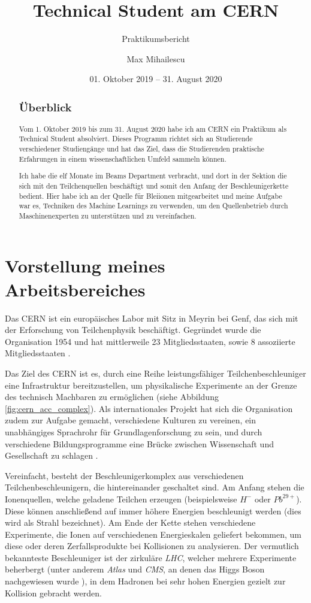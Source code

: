 \documentclass[11pt, a4paper, titlepage, headings=standardclasses]{scrartcl}
\author{Max Mihailescu}
\title{Technical Student am CERN}
\subtitle{Praktikumsbericht}
\date{01. Oktober 2019 -- 31. August 2020}
\begin{document}
\maketitle
{}

\begin{abstract}
	\subsection*{Überblick}
	\noindent Vom 1. Oktober 2019 bis zum 31. August 2020 habe ich am CERN ein Praktikum als Technical Student absolviert. Dieses Programm richtet sich an Studierende verschiedener Studiengänge und hat das Ziel, dass die Studierenden praktische Erfahrungen in einem wissenschaftlichen Umfeld sammeln können.
	
	Ich habe die elf Monate im Beams Department verbracht, und dort in der Sektion die sich mit den Teilchenquellen beschäftigt und somit den Anfang der Beschleunigerkette bedient. Hier habe ich an der Quelle für Bleiionen mitgearbeitet und meine Aufgabe war es, Techniken des Machine Learnings zu verwenden, um den Quellenbetrieb durch Maschinenexperten zu unterstützen und zu vereinfachen.
\end{abstract}

\section{Vorstellung meines Arbeitsbereiches}
Das CERN ist ein europäisches Labor mit Sitz in Meyrin bei Genf, das sich mit der Erforschung von Teilchenphysik beschäftigt. Gegründet wurde die Organisation 1954 und hat mittlerweile 23 Mitgliedsstaaten, sowie 8 assoziierte Mitgliedsstaaten \cite{CERN:AnnualReport2019}. 

Das Ziel des CERN ist es, durch eine Reihe leistungsfähiger Teilchenbeschleuniger eine Infrastruktur bereitzustellen, um physikalische Experimente an der Grenze des technisch Machbaren zu ermöglichen (siehe Abbildung \ref{fig:cern_acc_complex}). Als internationales Projekt hat sich die Organisation zudem zur Aufgabe gemacht, verschiedene Kulturen zu vereinen, ein unabhängiges Sprachrohr für Grundlagenforschung zu sein, und durch verschiedene Bildungsprogramme eine Brücke zwischen Wissenschaft und Gesellschaft zu schlagen \cite{CERN:Mission}.

Vereinfacht, besteht der Beschleunigerkomplex aus verschiedenen Teilchenbeschleunigern, die hintereinander geschaltet sind. Am Anfang stehen die Ionenquellen, welche geladene Teilchen erzeugen (beispielsweise $H^-$ oder $Pb^{29+}$). Diese können anschließend auf immer höhere Energien beschleunigt werden (dies wird als Strahl bezeichnet). Am Ende der Kette stehen verschiedene Experimente, die Ionen auf verschiedenen Energieskalen geliefert bekommen, um diese oder deren Zerfallsprodukte bei Kollisionen zu analysieren. Der vermutlich bekannteste Beschleuniger ist der zirkuläre \textit{LHC}, welcher mehrere Experimente beherbergt (unter anderem \textit{Atlas} und \textit{CMS}, an denen das Higgs Boson nachgewiesen wurde \cite{Atlas:Higgs}), in dem Hadronen bei sehr hohen Energien gezielt zur Kollision gebracht werden.
\end{document}
